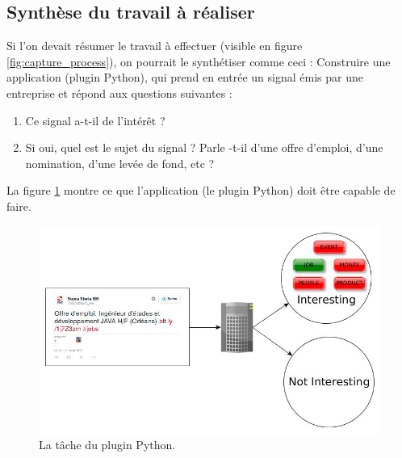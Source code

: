     \subsection{Synthèse du travail à réaliser}
        Si l'on devait résumer le travail à effectuer (visible en figure \ref{fig:capture_process}), on pourrait le synthétiser comme ceci : Construire une application (plugin Python), qui prend en entrée un signal émis par une entreprise et répond aux questions suivantes :
        \begin{enumerate}
            \item Ce signal a-t-il de l'intérêt ?
            \item Si oui, quel est le sujet du signal ? Parle -t-il d'une offre d'emploi, d'une nomination, d'une levée de fond, etc ?
        \end{enumerate}
        La figure \ref{fig:process} montre ce que l'application (le plugin Python) doit être capable de faire.

        \begin{figure}[h!]
            \centering
            \includegraphics[width=\textwidth]{images/process.jpg}
            \caption{La tâche du plugin Python.}
            \label{fig:process}
        \end{figure}

